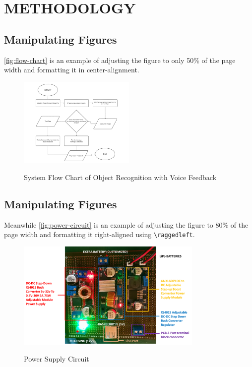 \section{METHODOLOGY}
\label{sec:METHODOLOGY}

\subsection{Manipulating Figures}

\autoref{fig:flow-chart} is an example of adjusting the figure to only 50\% of the page width and formatting it in center-alignment.

    \begin{figure}[ht]
        \caption{System Flow Chart of Object Recognition with Voice Feedback}
        \centering
        \includegraphics[width=0.5\textwidth]{Images/system-flow-chart.png}
        \label{fig:flow-chart}
    \end{figure}

\subsection{Manipulating Figures}

Meanwhile \autoref{fig:power-circuit} is an example of adjusting the figure to 80\% of the page width and formatting it right-aligned using \verb|\raggedleft|.

    \begin{figure}[ht]
        \caption{Power Supply Circuit}
        \raggedleft
        \includegraphics[width=0.8\textwidth]{Images/power-supply-circuit.png}
        \label{fig:power-circuit}
    \end{figure}